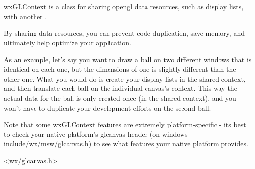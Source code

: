 \section{}\label{wxglcontext}

wxGLContext is a class for sharing opengl data resources, such as display lists, with another .

By sharing data resources, you can prevent code duplication, save memory, and ultimately help optimize your application.

As an example, let's say you want to draw a ball on two different windows that is identical on each one, but the dimensions of one is slightly different than the other one.  What you would do is create your display lists in the shared context, and then translate each ball on the individual canvas's context.  This way the actual data for the ball is only created once (in the shared context), and you won't have to duplicate your development efforts on the second ball.

Note that some wxGLContext features are extremely platform-specific - its best to check your native platform's glcanvas header (on windows include/wx/msw/glcanvas.h) to see what features your native platform provides.




<wx/glcanvas.h>




\label{wxglcontextconstr}





\label{wxglcontextgetwindow}

